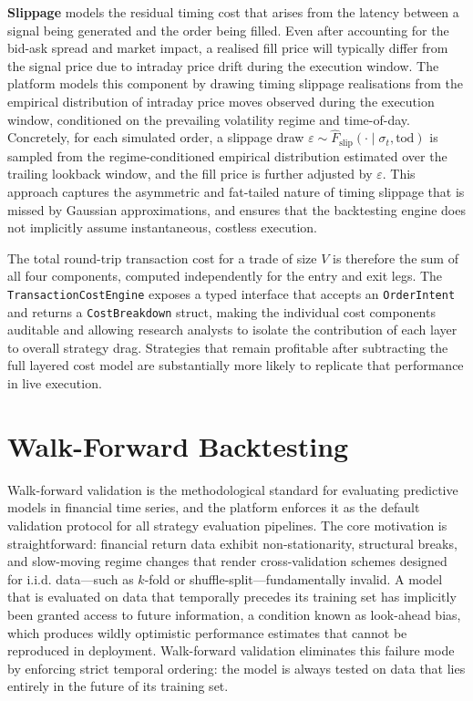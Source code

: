 \documentclass[12pt,openany]{book}
\numberwithin{equation}{chapter}
\theoremstyle{plain}
\theoremstyle{definition}
\theoremstyle{remark}
\begin{document}
\textbf{Slippage} models the residual timing cost that arises from the latency between a signal being generated and the order being filled. Even after accounting for the bid-ask spread and market impact, a realised fill price will typically differ from the signal price due to intraday price drift during the execution window. The platform models this component by drawing timing slippage realisations from the empirical distribution of intraday price moves observed during the execution window, conditioned on the prevailing volatility regime and time-of-day. Concretely, for each simulated order, a slippage draw $\varepsilon \sim \hat{F}_{\text{slip}}(\cdot \mid \sigma_t, \text{tod})$ is sampled from the regime-conditioned empirical distribution estimated over the trailing lookback window, and the fill price is further adjusted by $\varepsilon$. This approach captures the asymmetric and fat-tailed nature of timing slippage that is missed by Gaussian approximations, and ensures that the backtesting engine does not implicitly assume instantaneous, costless execution.

The total round-trip transaction cost for a trade of size $V$ is therefore the sum of all four components, computed independently for the entry and exit legs. The \texttt{TransactionCostEngine} exposes a typed interface that accepts an \texttt{OrderIntent} and returns a \texttt{CostBreakdown} struct, making the individual cost components auditable and allowing research analysts to isolate the contribution of each layer to overall strategy drag. Strategies that remain profitable after subtracting the full layered cost model are substantially more likely to replicate that performance in live execution.

\section{Walk-Forward Backtesting}

Walk-forward validation is the methodological standard for evaluating predictive models in financial time series, and the platform enforces it as the default validation protocol for all strategy evaluation pipelines. The core motivation is straightforward: financial return data exhibit non-stationarity, structural breaks, and slow-moving regime changes that render cross-validation schemes designed for i.i.d. data---such as $k$-fold or shuffle-split---fundamentally invalid. A model that is evaluated on data that temporally precedes its training set has implicitly been granted access to future information, a condition known as look-ahead bias, which produces wildly optimistic performance estimates that cannot be reproduced in deployment. Walk-forward validation eliminates this failure mode by enforcing strict temporal ordering: the model is always tested on data that lies entirely in the future of its training set.
\end{document}
